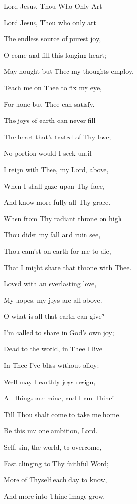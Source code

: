 \documentclass[12pt]{book}
\begin{document}
\begin{song}{Lord Jesus, Thou Who Only Art}{}
  {\SBPubDom}
  {}
  {}
  {}

  \begin{SBVerse}
    Lord Jesus, Thou who only art

    The endless source of purest joy,

    O come and fill this longing heart;

    May nought but Thee my thoughts employ.

    Teach me on Thee to fix my eye,

    For none but Thee can satisfy.
  \end{SBVerse}

  \begin{SBVerse}
    The joys of earth can never fill

    The heart that's tasted of Thy love;

    No portion would I seek until

    I reign with Thee, my Lord, above,

    When I shall gaze upon Thy face,

    And know more fully all Thy grace.
  \end{SBVerse}

  \begin{SBVerse}
    When from Thy radiant throne on high

    Thou didst my fall and ruin see,

    Thou cam'st on earth for me to die,

    That I might share that throne with Thee.

    Loved with an everlasting love,

    My hopes, my joys are all above.
  \end{SBVerse}

  \begin{SBVerse}
    O what is all that earth can give?

    I'm called to share in God's own joy;

    Dead to the world, in Thee I live,

    In Thee I've bliss without alloy:

    Well may I earthly joys resign;

    All things are mine, and I am Thine!
  \end{SBVerse}

  \begin{SBVerse}
    Till Thou shalt come to take me home,

    Be this my one ambition, Lord,

    Self, sin, the world, to overcome,

    Fast clinging to Thy faithful Word;

    More of Thyself each day to know,

    And more into Thine image grow.
  \end{SBVerse}
\end{song}
\end{document}
